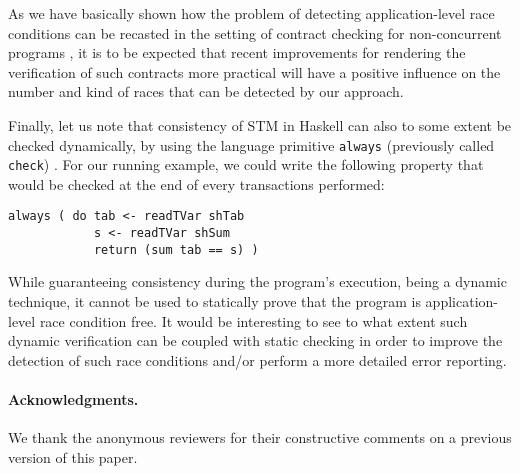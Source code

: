 \documentclass[submission,copyright,creativecommons]{eptcs}
\begin{document}
As we have basically shown how the problem of detecting application-level race conditions can be recasted in the setting of contract checking for non-concurrent programs \cite{static-contract-checking,sound-complete-models}, it is to be expected that recent improvements for rendering the verification of such contracts more practical \cite{halo-haskell-logic} will have a positive influence on the number and kind of races that can be detected by our approach.


Finally, let us note that consistency of STM in Haskell can also to some extent be checked dynamically, by using the language primitive \texttt{always} (previously called \texttt{check}) \cite{transactional-memory-data}. For our running example, we could write the following property that would be checked at the end of every transactions performed:

\begin{footnotesize}
\begin{verbatim}
always ( do tab <- readTVar shTab
            s <- readTVar shSum 
            return (sum tab == s) ) 
\end{verbatim}
\end{footnotesize}
While guaranteeing consistency during the program's execution, being a dynamic technique, it cannot be used to statically prove that the program is application-level race condition free. It would be interesting to see to what extent such dynamic verification can be coupled with static checking in order to improve the detection of such race conditions and/or perform a more detailed error reporting.

 


\paragraph{Acknowledgments.} 
We thank the anonymous reviewers for their constructive comments on a previous version of this paper.



 
 
 
 

 
\end{document}
